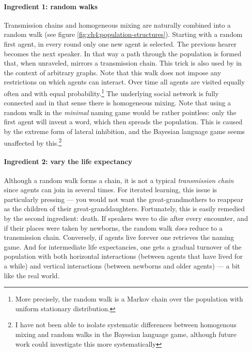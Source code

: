 \documentclass{../src/bcthesispart}
\begin{document}
\paragraph{Ingredient 1: random walks}

Transmission chains and homogeneous mixing are naturally combined into a random walk (see figure 
\ref{fig:ch4:population-structures}).
Starting with a random first agent, in every round only one new agent is selected. 
The previous hearer becomes the next speaker.
In that way a path through the population is formed that, when unraveled, mirrors a transmission chain.
This trick is also used by \textcite{Whalen2017} in the context of arbitrary graphs.
Note that this walk does not impose any restrictions on which agents can interact.
Over time all agents are visited equally often and with equal probability.\footnote{%
	More precisely, the random walk is a Markov chain over the population with uniform stationary distribution.
	}
The underlying social network is fully connected and in that sense there is homogeneous mixing. 
Note that using a random walk in the \emph{minimal} naming game would be rather pointless: only the first agent will invent a word, which then spreads the population.
This is caused by the extreme form of lateral inhibition, and the Bayesian language game seems unaffected by this.\footnote{%
	I have not been able to isolate systematic differences between homogenous mixing and random walks in the Bayesian language game, although future work could investigate this more systematically
	}





\paragraph{Ingredient 2: vary the life expectancy}

Although a random walk forms a chain, it is not a typical \emph{transmission chain} since agents can join in several times.
For iterated learning, this issue is particularly pressing — you would not want the great-grandmothers to reappear as the children of their great-granddaughters.
Fortunately, this is easily remedied by the second ingredient: death.
If speakers were to die after every encounter, and if their places were taken by newborns, the random walk \emph{does} reduce to a transmission chain.
Conversely, if agents live forever one retrieves the naming game.
And for intermediate life expectancies, one gets a gradual turnover of the population with both horizontal interactions (between agents that have lived for a while) and vertical interactions (between newborns and older agents) — a bit like the real world.
\end{document}

